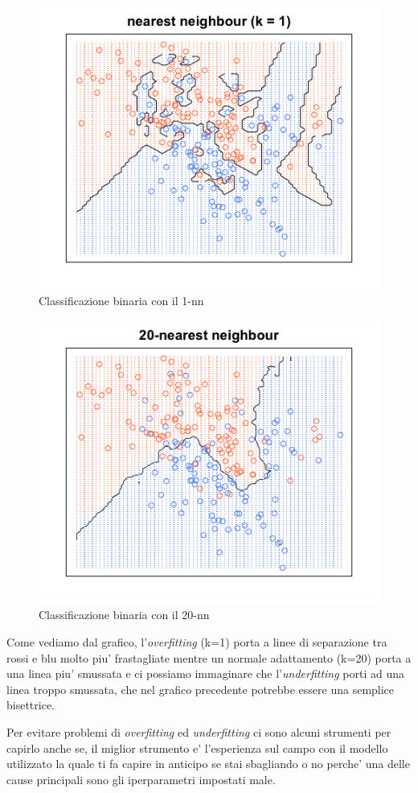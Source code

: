 \begin{figure}[H]
	\centering
	\includegraphics[width=0.7\linewidth]{img/1nearestneigh}
	\caption{Classificazione binaria con il 1-nn}
	\label{fig:1nearestneigh}
\end{figure}

\begin{figure}[H]
	\centering
	\includegraphics[width=0.7\linewidth]{img/20nearestneigh}
	\caption{Classificazione binaria con il 20-nn}
	\label{fig:20nearestneigh}
\end{figure}
Come vediamo dal grafico, l'\textit{overfitting} (k=1) porta a linee di separazione tra rossi e blu molto piu' frastagliate mentre un normale adattamento (k=20) porta a una linea piu' smussata e ci possiamo immaginare che l'\textit{underfitting} porti ad una linea troppo smussata, che nel grafico precedente potrebbe essere una semplice bisettrice.

Per evitare problemi di \textit{overfitting} ed \textit{underfitting} ci sono alcuni strumenti per capirlo anche se, il miglior strumento e' l'esperienza sul campo con il modello utilizzato la quale ti fa capire in anticipo se stai sbagliando o no perche' una delle cause principali sono gli iperparametri impostati male.

